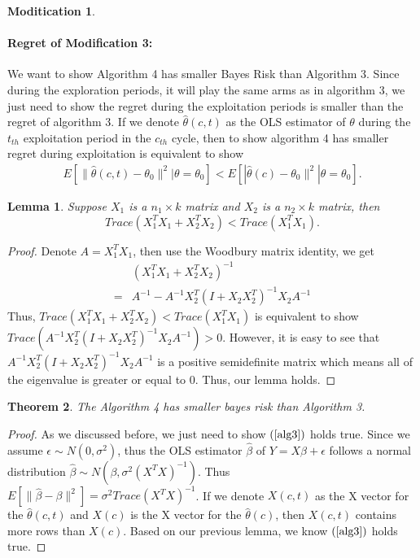 \documentclass{article}
\newtheorem{theorem}{Theorem}
\newtheorem{lemma}[theorem]{Lemma}
\theoremstyle{plain}
\theoremstyle{definition}
\newtheorem{modification}{Moditication}
\begin{document}
\begin{modification}
\paragraph{Regret of Modification 3:}
We want to show Algorithm 4 has smaller Bayes Risk than Algorithm 3. Since during the exploration periods, it will play the same arms as in algorithm 3, we just need to show the regret during the exploitation periods is smaller than the regret of algorithm 3. If we denote $\hat{\theta}(c,t)$ as the OLS estimator of $\theta$ during the $t_{th}$ exploitation period in the $c_{th}$ cycle, then to show algorithm 4 has smaller regret during exploitation is equivalent to show 
\begin{align}
E[\|\hat{\theta}(c,t)-\theta_{0}\|^{2}|\theta=\theta_{0}] < E[|\hat{\theta}(c)-\theta_{0}\|^{2}|\theta=\theta_{0}]. \label{alg3}
\end{align}
\begin{lemma}
Suppose $X_{1}$ is a $n_{1}\times k $ matrix and $X_{2}$ is a $n_{2}\times k$ matrix, then
\begin{equation}
Trace(X_{1}^{T}X_{1}+X_{2}^{T}X_{2}) < Trace(X_{1}^{T}X_{1}). \nonumber
\end{equation}
\end{lemma}
\begin{proof}
Denote $A=X_{1}^{T}X_{1}$, then use the Woodbury matrix identity, we get
\begin{align}
&(X_{1}^{T}X_{1}+X_{2}^{T}X_{2})^{-1} \nonumber \\
=& A^{-1}-A^{-1}X_{2}^{T}(I+X_{2}X_{2}^{T})^{-1}X_{2}A^{-1} \nonumber 
\end{align}
Thus, $Trace(X_{1}^{T}X_{1}+X_{2}^{T}X_{2}) < Trace(X_{1}^{T}X_{1})$ is equivalent to show $Trace(A^{-1}X_{2}^{T}(I+X_{2}X_{2}^{T})^{-1}X_{2}A^{-1})>0$. However, it is easy to see that $A^{-1}X_{2}^{T}(I+X_{2}X_{2}^{T})^{-1}X_{2}A^{-1}$ is a positive semidefinite matrix which means all of the eigenvalue is greater or equal to 0. Thus, our lemma holds.
\end{proof}

\begin{theorem}
The Algorithm 4 has smaller bayes risk than Algorithm 3.
\end{theorem}
\begin{proof}
As we discussed before, we just need to show $(\ref{alg3})$ holds true. Since we assume $\epsilon\sim N(0,\sigma^{2})$, thus the OLS estimator $\hat{\beta}$ of $Y=X\beta+\epsilon$ follows a normal distribution $\hat{\beta}\sim N(\beta,\sigma^{2}(X^{T}X)^{-1})$. Thus $E[\|\hat{\beta}-\beta\|^{2}]=\sigma^{2}Trace(X^{T}X)^{-1}$. If we denote $X(c,t)$ as the X vector for the $\hat{\theta}(c,t)$ and $X(c)$ is the X vector for the $\hat{\theta}(c)$, then $X(c,t)$ contains more rows than $X(c)$. Based on our previous lemma, we know $(\ref{alg3})$ holds true.
\end{proof}


\end{modification}
\end{document}
